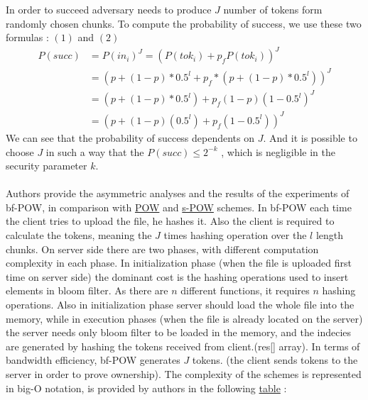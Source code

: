 \documentclass[12pt]{article}
\begin{document}
In order to succeed adversary needs to produce $J$ number of tokens form randomly chosen chunks. To compute the probability of success, we use these two formulas : $(1)$ and $(2)$
\begin{equation}\label{3}
\begin{split}
P(succ)& =P(in_i)^J=(P(tok_i)+p_fP(tok_i))^J\\
       & =(p+(1-p)*0.5^l + p_f*(p+(1-p)*0.5^l))^J\\
       & =(p+(1-p)*0.5^l)+p_f(1-p)(1-0.5^l)^J \\
       & =(p+(1-p)(0.5^l)+p_f(1-0.5^l))^J
\end{split}
\end{equation}
We can see that the probability   of success dependents on $J$. And it is possible to choose $J$ in such a way that the $P(succ) \leq 2^{-k}$ , which is negligible in the security parameter $k$.\\\\
Authors provide the asymmetric analyses and the results of the experiments of bf-POW, in comparison with \hyperref[sub:Soltuion1]{POW} and \hyperref[sub:Soltuion2]{s-POW} schemes. In bf-POW each time the client tries to upload the file, he hashes it. Also the client is required to calculate the tokens, meaning the $J$ times hashing operation over the $l$ length chunks. On server side there are two phases, with different computation complexity in each phase. In initialization phase (when the file is uploaded first time on server side) the dominant cost is the hashing operations used to insert elements in bloom filter. As there are $n$ different functions, it requires $n$ hashing operations. Also in initialization phase server should load the whole file into the memory, while in execution phases (when the file is already located on the server) the server needs only bloom filter to be loaded in the memory, and the indecies are generated by hashing the tokens received from client.(res[] array). In terms of bandwidth efficiency, bf-POW generates $J$ tokens. (the client sends tokens to the server in order to prove ownership). 
The complexity of the schemes is represented in big-O notation, is provided by authors in the following  \hyperref[table:asymptoticAnalysisBF-POW]{table} : 
\end{document}
